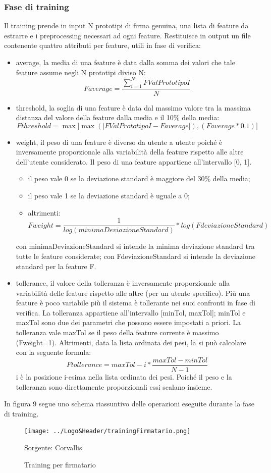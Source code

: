\subsubsection*{Fase di training}
\label{2.1.4.1}
Il training prende in input N prototipi di firma genuina, una lista di feature da estrarre e i preprocessing necessari ad ogni feature. Restituisce in output un file contenente quattro attributi per feature, utili in fase di verifica:
\begin{itemize}
\item average, la media di una feature è data dalla somma dei valori che tale feature assume negli N prototipi diviso N:
\[Faverage =
\frac{\sum\limits_{i=1}^N FValPrototipoI}{N}
\]
\item threshold, la soglia di una feature è data dal massimo valore tra la massima distanza del valore della feature dalla media e il 10\% della media:
\[Fthreshold = 
\max \lbrack \max ( |FValPrototipoI - Faverage| ) , ( Faverage * 0.1 )\rbrack
\]
\item weight, il peso di una feature è diverso da utente a utente poiché è inversamente proporzionale alla variabilità della feature rispetto alle altre dell'utente considerato. Il peso di una feature appartiene all'intervallo [0, 1].
\begin{itemize}
\item il peso vale 0 se la deviazione standard è maggiore del 30\% della media;
\item il peso vale 1 se la deviazione standard è uguale a 0;
\item altrimenti:
\[Fweight = \frac{1}{log(minimaDeviazioneStandard)} * log(FdeviazioneStandard)\]
\end{itemize}
con minimaDeviazioneStandard si intende la minima deviazione standard tra tutte le feature considerate; con FdeviazioneStandard si intende la deviazione standard per la feature F.
\item tollerance, il valore della tolleranza è inversamente proporzionale alla variabilità delle feature rispetto alle altre (per un utente specifico). Più una feature è poco variabile più il sistema è tollerante nei suoi confronti in fase di verifica. La tolleranza appartiene all'intervallo [minTol, maxTol]; minTol e maxTol sono due dei parametri che possono essere impostati a priori. La tolleranza vale maxTol se il peso della feature corrente è massimo (Fweight=1). Altrimenti, data la lista ordinata dei pesi, la si può calcolare con la seguente formula:
\[Ftollerance=maxTol - i * \frac{maxTol - minTol}{N-1}\]
i è la posizione i-esima nella lista ordinata dei pesi. Poiché il peso e la tolleranza sono direttamente proporzionali essi scalano insieme.
\end{itemize}
In figura 9 segue uno schema riassuntivo delle operazioni eseguite durante la fase di training.
\begin{figure}[H]
\centering
\texttt{[image: ../Logo\&Header/trainingFirmatario.png]}
\caption{Training per firmatario}Sorgente: Corvallis
\end{figure}

